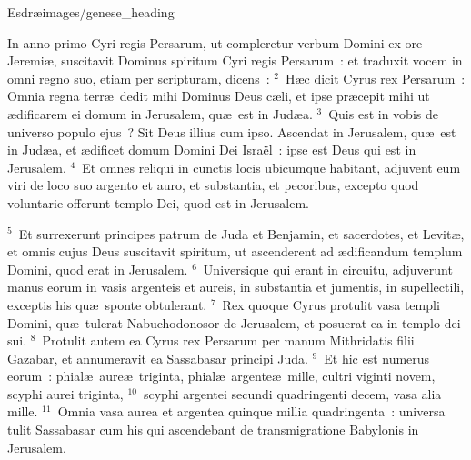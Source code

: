 {Esdræ}{images/genese_heading}


\lettrine[lines=10,image=true,loversize=0.05,lraise=-0.03]{I}{}n anno primo Cyri regis Persarum, ut compleretur verbum Domini ex ore Jeremi\ae , suscitavit Dominus spiritum Cyri regis Persarum~: et traduxit vocem in omni regno suo, etiam per scripturam, dicens~:
${}^{2}$~H\ae c dicit Cyrus rex Persarum~: Omnia regna terr\ae\ dedit mihi Dominus Deus c\ae li, et ipse pr\ae cepit mihi ut \ae dificarem ei domum in Jerusalem, qu\ae\ est in Jud\ae a.
${}^{3}$~Quis est in vobis de universo populo ejus~? Sit Deus illius cum ipso. Ascendat in Jerusalem, qu\ae\ est in Jud\ae a, et \ae dificet domum Domini Dei Isra\"el~: ipse est Deus qui est in Jerusalem.
${}^{4}$~Et omnes reliqui in cunctis locis ubicumque habitant, adjuvent eum viri de loco suo argento et auro, et substantia, et pecoribus, excepto quod voluntarie offerunt templo Dei, quod est in Jerusalem.


${}^{5}$~Et surrexerunt principes patrum de Juda et Benjamin, et sacerdotes, et Levit\ae , et omnis cujus Deus suscitavit spiritum, ut ascenderent ad \ae dificandum templum Domini, quod erat in Jerusalem.
${}^{6}$~Universique qui erant in circuitu, adjuverunt manus eorum in vasis argenteis et aureis, in substantia et jumentis, in supellectili, exceptis his qu\ae\ sponte obtulerant.
${}^{7}$~Rex quoque Cyrus protulit vasa templi Domini, qu\ae\ tulerat Nabuchodonosor de Jerusalem, et posuerat ea in templo dei sui.
${}^{8}$~Protulit autem ea Cyrus rex Persarum per manum Mithridatis filii Gazabar, et annumeravit ea Sassabasar principi Juda.
${}^{9}$~Et hic est numerus eorum~: phial\ae\ aure\ae\ triginta, phial\ae\ argente\ae\ mille, cultri viginti novem, scyphi aurei triginta,
${}^{10}$~scyphi argentei secundi quadringenti decem, vasa alia mille.
${}^{11}$~Omnia vasa aurea et argentea quinque millia quadringenta~: universa tulit Sassabasar cum his qui ascendebant de transmigratione Babylonis in Jerusalem.

